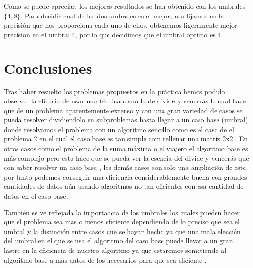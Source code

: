 \documentclass[11pt,openany]{book}
\begin{document}
Como se puede apreciar, los mejores resultados se han obtenido con los umbrales $\{4,8\}$.
Para decidir cual de los dos umbrales es el mejor, nos fijamos en la precisión
que nos proporciona cada uno de ellos, obtenemos ligeramente mejor precision en el umbral 4, por lo que
decidimos que el umbral óptimo es 4.


\chapter{Conclusiones}

Tras haber resuelto los problemas propuestos en la práctica hemos podido observar la eficacia
de usar una técnica como la de divide y vencerás la cual hace que de un problema aparentemente 
extenso y con una gran variedad de casos se pueda resolver dividiendolo  en subproblemas hasta llegar 
a un caso base (umbral) donde resolvamos el problema con un algoritmo sencillo como es el caso de 
el problema 2 en el cual el caso base es tan simple com rellenar una matriz 2x2 . En otros casos como 
el problema de la suma máxima o  el viajero  el algoritmo base es más complejo pero esto hace que se pueda ver la esencia del 
divide y vencerás que con saber resolver un caso base , los demás casos son solo una ampliación de este por tanto podemos conseguir una
eficiencia considerablemente buena con grandes cantidades de datos  aún usando algoritmos no tan eficientes con esa cantidad de  datos en el caso base.

También se ve reflejada la importancia de los umbrales los cuales pueden hacer que el problema sea mas o menos eficiente 
dependiendo de lo preciso que sea el umbral y la distinción entre casos que se hayan  hecho ya que una mala elección 
del umbral en el que se usa el algoritmo del caso base puede llevar a un gran lastre en la eficiencia de nuestro algoritmo 
ya que estaremos sometiendo al algoritmo  base a más datos de los necesarios para que sea eficiente .
\end{document}
